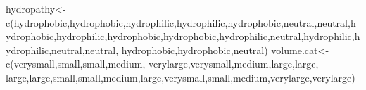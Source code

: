 \documentclass[
]{book}
\newenvironment{Shaded}{\begin{snugshade}}{\end{snugshade}}
\newcommand{\FunctionTok}[1]{\textcolor[rgb]{0.00,0.00,0.00}{#1}}
\newcommand{\NormalTok}[1]{#1}
\newcommand{\OtherTok}[1]{\textcolor[rgb]{0.56,0.35,0.01}{#1}}
\newcommand{\StringTok}[1]{\textcolor[rgb]{0.31,0.60,0.02}{#1}}
\begin{document}
\begin{Shaded}
\begin{Highlighting}[]
\NormalTok{hydropathy}\OtherTok{\textless{}{-}}\FunctionTok{c}\NormalTok{(}\StringTok{\textquotesingle{}hydrophobic\textquotesingle{}}\NormalTok{,}\StringTok{\textquotesingle{}hydrophobic\textquotesingle{}}\NormalTok{,}\StringTok{\textquotesingle{}hydrophilic\textquotesingle{}}\NormalTok{,}\StringTok{\textquotesingle{}hydrophilic\textquotesingle{}}\NormalTok{,}\StringTok{\textquotesingle{}hydrophobic\textquotesingle{}}\NormalTok{,}\StringTok{\textquotesingle{}neutral\textquotesingle{}}\NormalTok{,}\StringTok{\textquotesingle{}neutral\textquotesingle{}}\NormalTok{,}\StringTok{\textquotesingle{}hydrophobic\textquotesingle{}}\NormalTok{,}\StringTok{\textquotesingle{}hydrophilic\textquotesingle{}}\NormalTok{,}\StringTok{\textquotesingle{}hydrophobic\textquotesingle{}}\NormalTok{,}\StringTok{\textquotesingle{}hydrophobic\textquotesingle{}}\NormalTok{,}\StringTok{\textquotesingle{}hydrophilic\textquotesingle{}}\NormalTok{,}\StringTok{\textquotesingle{}neutral\textquotesingle{}}\NormalTok{,}\StringTok{\textquotesingle{}hydrophilic\textquotesingle{}}\NormalTok{,}\StringTok{\textquotesingle{}hydrophilic\textquotesingle{}}\NormalTok{,}\StringTok{\textquotesingle{}neutral\textquotesingle{}}\NormalTok{,}\StringTok{\textquotesingle{}neutral\textquotesingle{}}\NormalTok{,}
              \StringTok{\textquotesingle{}hydrophobic\textquotesingle{}}\NormalTok{,}\StringTok{\textquotesingle{}hydrophobic\textquotesingle{}}\NormalTok{,}\StringTok{\textquotesingle{}neutral\textquotesingle{}}\NormalTok{)}
\NormalTok{volume.cat}\OtherTok{\textless{}{-}}\FunctionTok{c}\NormalTok{(}\StringTok{\textquotesingle{}verysmall\textquotesingle{}}\NormalTok{,}\StringTok{\textquotesingle{}small\textquotesingle{}}\NormalTok{,}\StringTok{\textquotesingle{}small\textquotesingle{}}\NormalTok{,}\StringTok{\textquotesingle{}medium\textquotesingle{}}\NormalTok{,}
              \StringTok{\textquotesingle{}verylarge\textquotesingle{}}\NormalTok{,}\StringTok{\textquotesingle{}verysmall\textquotesingle{}}\NormalTok{,}\StringTok{\textquotesingle{}medium\textquotesingle{}}\NormalTok{,}\StringTok{\textquotesingle{}large\textquotesingle{}}\NormalTok{,}\StringTok{\textquotesingle{}large\textquotesingle{}}\NormalTok{,}
              \StringTok{\textquotesingle{}large\textquotesingle{}}\NormalTok{,}\StringTok{\textquotesingle{}large\textquotesingle{}}\NormalTok{,}\StringTok{\textquotesingle{}small\textquotesingle{}}\NormalTok{,}\StringTok{\textquotesingle{}small\textquotesingle{}}\NormalTok{,}\StringTok{\textquotesingle{}medium\textquotesingle{}}\NormalTok{,}\StringTok{\textquotesingle{}large\textquotesingle{}}\NormalTok{,}\StringTok{\textquotesingle{}verysmall\textquotesingle{}}\NormalTok{,}\StringTok{\textquotesingle{}small\textquotesingle{}}\NormalTok{,}\StringTok{\textquotesingle{}medium\textquotesingle{}}\NormalTok{,}\StringTok{\textquotesingle{}verylarge\textquotesingle{}}\NormalTok{,}\StringTok{\textquotesingle{}verylarge\textquotesingle{}}\NormalTok{)}

\end{Highlighting}
\end{Shaded}
\end{document}
